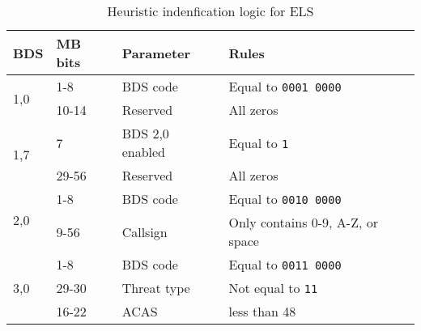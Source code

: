 \begin{table}
\centering
\small
\caption{Heuristic indenfication logic for ELS}
\label{tb:bds_rule_els}
\begin{tabular}{|l|l|l|l|}
\hline
\textbf{BDS} & \textbf{MB bits} & \textbf{Parameter} & \textbf{Rules} \\ \hline \hline
\multirow{2}{*}{1,0} & 1-8 & BDS code & Equal to \texttt{0001 0000}  \\ \cline{2-4} 
 & 10-14 & Reserved & All zeros \\ \hline \hline
\multirow{2}{*}{1,7} & 7 & BDS 2,0 enabled & Equal to \texttt{1} \\ \cline{2-4} 
 & 29-56 & Reserved & All zeros \\ \hline \hline
\multirow{2}{*}{2,0} & 1-8 & BDS code & Equal to \texttt{0010 0000} \\ \cline{2-4} 
 & 9-56 & Callsign & Only contains 0-9, A-Z, or space \\ \hline \hline
\multirow{3}{*}{3,0} & 1-8 & BDS code & Equal to \texttt{0011 0000} \\ \cline{2-4} 
 & 29-30 & Threat type & Not equal to \texttt{11} \\ \cline{2-4} 
 & 16-22 & ACAS &  less than 48 \\ \hline

\end{tabular}
\end{table}



